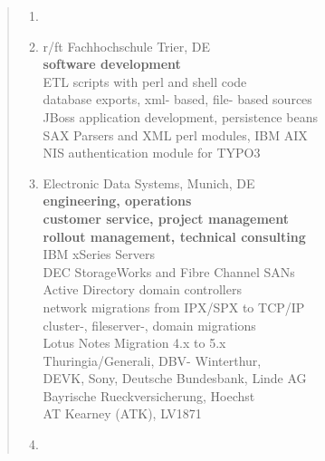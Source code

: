 \documentclass[a4paper]{report}
\begin{document}
\begin{quote}
\begin{enumerate}
\item[ ]

\item[2004 - 2006]  r/ft Fachhochschule Trier, DE\\
                    \textbf{software development}\\
                    ETL scripts with perl and shell code\\
                    database exports, xml- based, file- based sources\\
                    JBoss application development, persistence beans\\
                    SAX Parsers and XML perl modules, IBM AIX\\
                    NIS authentication module for TYPO3

\clearpage

\item[1999 - 2004]  Electronic Data Systems, Munich, DE\\
                    \textbf{engineering, operations}\\
                    \textbf{customer service, project management}\\
                    \textbf{rollout management, technical consulting}\\
                    IBM xSeries Servers\\
                    DEC StorageWorks and Fibre Channel SANs\\
                    Active Directory domain controllers\\
                    network migrations from IPX/SPX to TCP/IP\\
                    cluster-, fileserver-, domain migrations\\
                    Lotus Notes Migration 4.x to 5.x\\
                    Thuringia/Generali, DBV- Winterthur,\\
                    DEVK, Sony, Deutsche Bundesbank, Linde AG\\
                    Bayrische Rueckversicherung, Hoechst\\
                    AT Kearney (ATK), LV1871

\item[ ]


\end{enumerate}
\end{quote}
\end{document}
